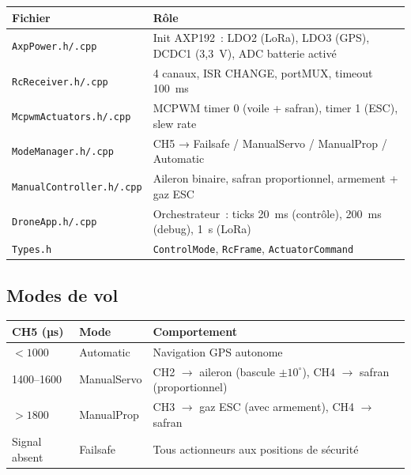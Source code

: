 \documentclass[12pt,a4paper]{article}
\newcommand{\file}[1]{\texttt{#1}}
\begin{document}
\begin{longtable}{L{4.5cm} L{8.5cm}}
  \toprule
  \textcolor{tableheadfg}{\textbf{Fichier}} &
  \textcolor{tableheadfg}{\textbf{Rôle}} \\
  \midrule
  \endhead
  \bottomrule
  \endfoot
  \file{AxpPower.h/.cpp} & Init AXP192~: LDO2 (LoRa), LDO3 (GPS),
                           DCDC1 (3,3~V), ADC batterie activé \\[3pt]
  \file{RcReceiver.h/.cpp} & 4 canaux, ISR CHANGE, portMUX, timeout 100~ms \\[3pt]
  \file{McpwmActuators.h/.cpp} & MCPWM timer 0 (voile + safran),
                                  timer 1 (ESC), slew rate \\[3pt]
  \file{ModeManager.h/.cpp} & CH5 → Failsafe / ManualServo / ManualProp /
                               Automatic \\[3pt]
  \file{ManualController.h/.cpp} & Aileron binaire, safran proportionnel,
                                   armement + gaz ESC \\[3pt]
  \file{DroneApp.h/.cpp} & Orchestrateur~: ticks 20~ms (contrôle),
                           200~ms (debug), 1~s (LoRa) \\[3pt]
  \file{Types.h} & \texttt{ControlMode}, \texttt{RcFrame},
                   \texttt{ActuatorCommand} \\
\end{longtable}

\subsection{Modes de vol}

\begin{longtable}{C{2cm} C{3cm} L{8cm}}
  \toprule
  \textcolor{tableheadfg}{\textbf{CH5 (µs)}} &
  \textcolor{tableheadfg}{\textbf{Mode}} &
  \textcolor{tableheadfg}{\textbf{Comportement}} \\
  \midrule
  \endhead
  \bottomrule
  \endfoot
  $< 1000$ & Automatic & Navigation GPS autonome \\[3pt]
  1400--1600 & ManualServo & CH2 $\to$ aileron (bascule $\pm10^{\circ}$),
               CH4 $\to$ safran (proportionnel) \\[3pt]
  $> 1800$ & ManualProp & CH3 $\to$ gaz ESC (avec armement),
             CH4 $\to$ safran \\[3pt]
  Signal absent & Failsafe & Tous actionneurs aux positions de sécurité \\
\end{longtable}
\end{document}
